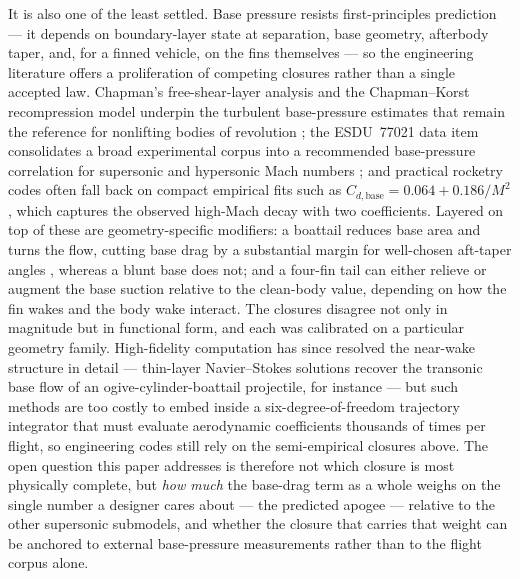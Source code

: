 It is also one of the least settled. Base pressure resists first-principles
prediction --- it depends on boundary-layer state at separation, base geometry,
afterbody taper, and, for a finned vehicle, on the fins themselves --- so the
engineering literature offers a proliferation of competing closures rather than
a single accepted law. Chapman's free-shear-layer analysis and the
Chapman--Korst recompression model underpin the turbulent base-pressure
estimates that remain the reference for nonlifting bodies of revolution
\cite{chapman1955}; the ESDU~77021 data item consolidates a broad experimental
corpus into a recommended base-pressure correlation for supersonic and
hypersonic Mach numbers \cite{esdu77021}; and practical rocketry codes often
fall back on compact empirical fits such as
$C_{d,\text{base}} = 0.064 + 0.186/M^{2}$, which captures the observed
high-Mach decay with two coefficients. Layered on top of these are
geometry-specific modifiers: a boattail reduces base area and turns the flow,
cutting base drag by a substantial margin for well-chosen aft-taper angles
\cite{viswanath1996}, whereas a blunt base does not; and a four-fin tail can
either relieve or augment the base suction relative to the clean-body value,
depending on how the fin wakes and the body wake interact. The closures
disagree not only in magnitude but in functional form, and each was calibrated
on a particular geometry family. High-fidelity computation has since resolved
the near-wake structure in detail --- thin-layer Navier--Stokes solutions
recover the transonic base flow of an ogive-cylinder-boattail projectile, for
instance \cite{sahu1983} --- but such methods are too costly to embed inside a
six-degree-of-freedom trajectory integrator that must evaluate aerodynamic
coefficients thousands of times per flight, so engineering codes still rely on
the semi-empirical closures above. The open question this paper addresses is
therefore not which closure is most physically complete, but \emph{how much} the
base-drag term as a whole weighs on the single number a designer cares about ---
the predicted apogee --- relative to the other supersonic submodels, and whether
the closure that carries that weight can be anchored to external base-pressure
measurements rather than to the flight corpus alone.

